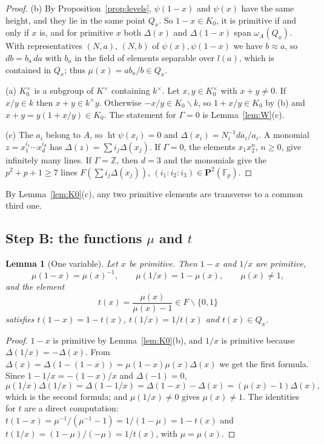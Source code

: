 \documentclass[11pt]{amsart}
\newtheorem{lemma}[theorem]{Lemma}
\theoremstyle{definition}
\theoremstyle{remark}
\newcommand{\ZZ}{\mathbb{Z}}
\newcommand{\FF}{\mathbb{F}}
\newcommand{\hgt}{\operatorname{ht}}
\newcommand{\sm}{\smallsetminus}
\begin{document}
\begin{proof}
(b) By Proposition~\ref{prop:levels}, $\psi(1-x)$ and $\psi(x)$ have the same height, and they lie in the same point $Q_x$. So $1-x\in K_0$, it is primitive if and only if $x$ is, and for primitive $x$ both $\Delta(x)$ and $\Delta(1-x)$ span $\omega_A(Q_x)$.
With representatives $(N,a)$, $(N,b)$ of $\psi(x),\psi(1-x)$ we have $b\approx a$, so $db=b_a\,da$ with $b_a$ in the field of elements separable over $l(a)$, which is contained in $Q_x$; thus $\mu(x)=ab_a/b\in Q_x$.

(a) $K_0^\times$ is a subgroup of $K^\times$ containing $k^\times$. Let $x,y\in K_0^\times$ with $x+y\ne0$. If $x/y\in k$ then $x+y\in k^\times y$. Otherwise $-x/y\in K_0\sm k$, so $1+x/y\in K_0$ by (b) and $x+y=y(1+x/y)\in K_0$.
The statement for $\Gamma=0$ is Lemma~\ref{lem:W}(c).

(c) The $a_i$ belong to $A$, so $\hgt\psi(x_i)=0$ and $\Delta(x_i)=N_i^{-1}da_i/a_i$. A monomial $z=x_1^{i_1}\cdots x_d^{i_d}$ has $\Delta(z)=\sum i_j\Delta(x_j)$.
If $\Gamma=0$, the elements $x_1x_2^n$, $n\ge0$, give infinitely many lines. If $\Gamma=\ZZ$, then $d=3$ and the monomials give the $p^2+p+1\ge7$ lines $F(\sum i_j\Delta(x_j))$, $(i_1:i_2:i_3)\in\mathbf P^2(\FF_p)$.
\end{proof}

By Lemma~\ref{lem:K0}(c), any two primitive elements are transverse to a common third one.

\subsection{Step B: the functions \texorpdfstring{$\mu$}{mu} and \texorpdfstring{$t$}{t}}

\begin{lemma}[One variable]\label{lem:onevar}
Let $x$ be primitive. Then $1-x$ and $1/x$ are primitive,
\[ \mu(1-x)=\mu(x)^{-1},\qquad \mu(1/x)=1-\mu(x),\qquad \mu(x)\neq1, \]
and the element
\[ t(x)=\frac{\mu(x)}{\mu(x)-1}\in F\sm\{0,1\} \]
satisfies $t(1-x)=1-t(x)$, $t(1/x)=1/t(x)$ and $t(x)\in Q_x$.
\end{lemma}

\begin{proof}
$1-x$ is primitive by Lemma~\ref{lem:K0}(b), and $1/x$ is primitive because $\Delta(1/x)=-\Delta(x)$. From $\Delta(x)=\Delta(1-(1-x))=\mu(1-x)\mu(x)\Delta(x)$ we get the first formula.
Since $1-1/x=-(1-x)/x$ and $\Delta(-1)=0$,
\[ \mu(1/x)\Delta(1/x)=\Delta(1-1/x)=\Delta(1-x)-\Delta(x)=(\mu(x)-1)\Delta(x), \]
which is the second formula; and $\mu(1/x)\ne0$ gives $\mu(x)\ne1$. The identities for $t$ are a direct computation: $t(1-x)=\mu^{-1}/(\mu^{-1}-1)=1/(1-\mu)=1-t(x)$ and $t(1/x)=(1-\mu)/(-\mu)=1/t(x)$, with $\mu=\mu(x)$.
\end{proof}
\end{document}
